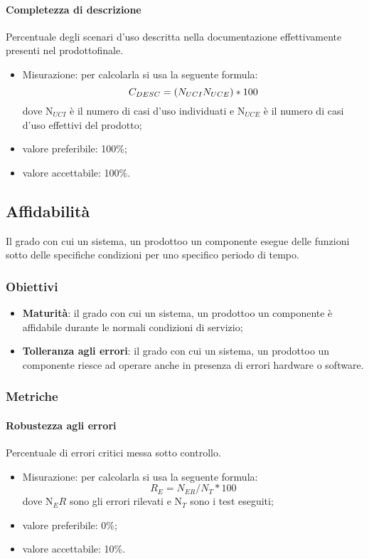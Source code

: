             \paragraph{Completezza di descrizione}
                Percentuale degli scenari d’uso descritta nella documentazione effettivamente presenti nel prodotto\glosp finale.
                \begin{itemize}
                    \item Misurazione: per calcolarla si usa la seguente formula:
                    \[C_{DESC}=(N_{UCI}\\N_{UCE})*100\]
                    dove N$_{UCI}$ è il numero di casi d'uso individuati e N$_{UCE}$ è il numero di casi d'uso effettivi del prodotto\glo;
                    \item valore preferibile: 100\%;
                    \item valore accettabile: 100\%.
                \end{itemize}
    \subsection{Affidabilità}
        Il grado con cui un sistema, un prodotto\glosp o un componente esegue delle funzioni sotto delle specifiche condizioni per uno specifico periodo di tempo.
        \subsubsection{Obiettivi}
            \begin{itemize}
                \item \textbf{Maturità}: il grado con cui un sistema, un prodotto\glosp o un componente è affidabile durante le normali condizioni di servizio;
                \item \textbf{Tolleranza agli errori}: il grado con cui un sistema, un prodotto\glosp o un componente riesce ad operare anche in presenza di errori hardware o software.
            \end{itemize}
        \subsubsection{Metriche}
            \paragraph{Robustezza agli errori}
                Percentuale di errori critici messa sotto controllo.
                \begin{itemize}
                    \item Misurazione: per calcolarla si usa la seguente formula:
                    \[R_E=N_{ER}/N_{T}*100\]
                    dove N$_ER$ sono gli errori rilevati e N$_T$ sono i test eseguiti;
                    \item valore preferibile: 0\%;
                    \item valore accettabile: 10\%.
                \end{itemize}
